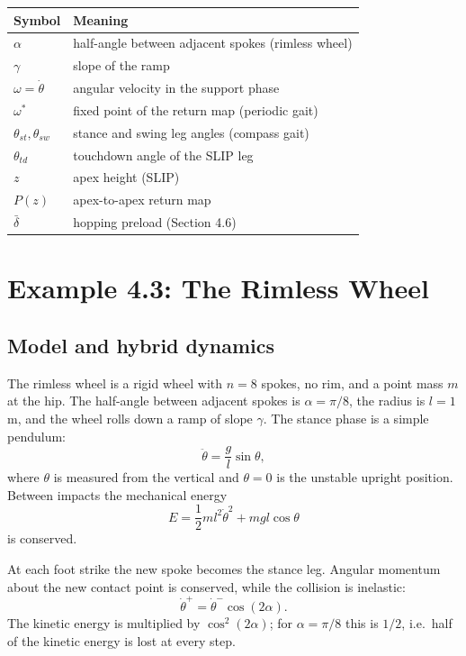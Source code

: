 \documentclass[11pt]{article}
\begin{document}
\begin{center}
\small
\begin{tabular}{ll}
\toprule
Symbol & Meaning \\
\midrule
$\alpha$ & half-angle between adjacent spokes (rimless wheel) \\
$\gamma$ & slope of the ramp \\
$\omega=\dot\theta$ & angular velocity in the support phase \\
$\omega^*$ & fixed point of the return map (periodic gait) \\
$\theta_{st},\theta_{sw}$ & stance and swing leg angles (compass gait) \\
$\theta_{td}$ & touchdown angle of the SLIP leg \\
$z$ & apex height (SLIP) \\
$P(z)$ & apex-to-apex return map \\
$\bar\delta$ & hopping preload (Section 4.6) \\
\bottomrule
\end{tabular}
\end{center}

\section{Example 4.3: The Rimless Wheel}

\subsection{Model and hybrid dynamics}

The rimless wheel is a rigid wheel with $n=8$ spokes, no rim, and a point mass
$m$ at the hip.  The half-angle between adjacent spokes is
$\alpha=\pi/8$, the radius is $l=1$ m, and the wheel rolls down a ramp of slope
$\gamma$.  The stance phase is a simple pendulum:
\begin{equation}
\ddot\theta=\frac{g}{l}\sin\theta,
\end{equation}
where $\theta$ is measured from the vertical and $\theta=0$ is the unstable
upright position.  Between impacts the mechanical energy
\begin{equation}
E=\frac12ml^2\dot\theta^2+mgl\cos\theta
\end{equation}
is conserved.

At each foot strike the new spoke becomes the stance leg.  Angular momentum
about the new contact point is conserved, while the collision is inelastic:
\begin{equation}
\dot\theta^+=\dot\theta^-\cos(2\alpha).
\end{equation}
The kinetic energy is multiplied by $\cos^2(2\alpha)$; for $\alpha=\pi/8$
this is $1/2$, i.e.\ half of the kinetic energy is lost at every step.
\end{document}
